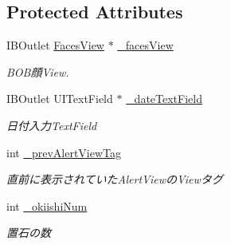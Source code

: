 \subsection*{Protected Attributes}
\begin{DoxyCompactItemize}
\item 
\hypertarget{interface_record_regist_view_controller_a780cd2f3bc45e96bee12fbdae7dda4c2}{
IBOutlet \hyperlink{interface_faces_view}{FacesView} $\ast$ \hyperlink{interface_record_regist_view_controller_a780cd2f3bc45e96bee12fbdae7dda4c2}{\_\-facesView}}
\label{interface_record_regist_view_controller_a780cd2f3bc45e96bee12fbdae7dda4c2}

\begin{DoxyCompactList}\small\item\em BOB顔View. \end{DoxyCompactList}\item 
\hypertarget{interface_record_regist_view_controller_a0d5bc2038e6bd996b7bf2c0ed6f2ed30}{
IBOutlet UITextField $\ast$ \hyperlink{interface_record_regist_view_controller_a0d5bc2038e6bd996b7bf2c0ed6f2ed30}{\_\-dateTextField}}
\label{interface_record_regist_view_controller_a0d5bc2038e6bd996b7bf2c0ed6f2ed30}

\begin{DoxyCompactList}\small\item\em 日付入力TextField \end{DoxyCompactList}\item 
\hypertarget{interface_record_regist_view_controller_a5704c9a7f85c90d9c4b000d33b67473b}{
int \hyperlink{interface_record_regist_view_controller_a5704c9a7f85c90d9c4b000d33b67473b}{\_\-prevAlertViewTag}}
\label{interface_record_regist_view_controller_a5704c9a7f85c90d9c4b000d33b67473b}

\begin{DoxyCompactList}\small\item\em 直前に表示されていたAlertViewのViewタグ \end{DoxyCompactList}\item 
\hypertarget{interface_record_regist_view_controller_acfe4fd11557d50797f8a974484d4b7b4}{
int \hyperlink{interface_record_regist_view_controller_acfe4fd11557d50797f8a974484d4b7b4}{\_\-okiishiNum}}
\label{interface_record_regist_view_controller_acfe4fd11557d50797f8a974484d4b7b4}

\begin{DoxyCompactList}\small\item\em 置石の数 \end{DoxyCompactList}\end{DoxyCompactItemize}


